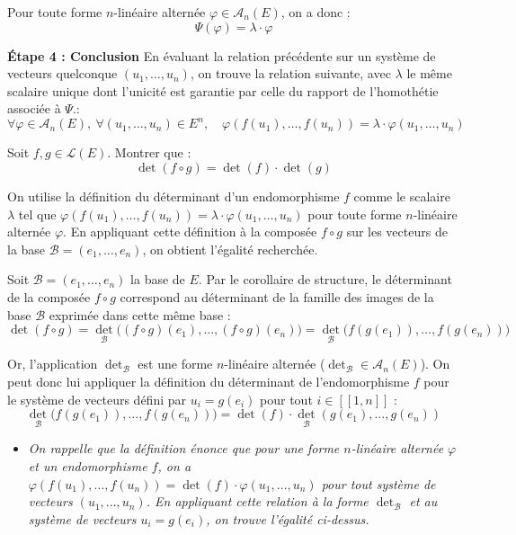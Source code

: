 \documentclass[11pt, a4paper]{article}
\theoremstyle{definition}
\begin{document}
\begin{outline}
	\2 Pour toute forme $n$-linéaire alternée $\varphi \in \mathscr{A}_n(E)$, on a donc :
	$$\Psi(\varphi) = \lambda \cdot \varphi$$

	\1 \textbf{Étape 4 : Conclusion}
	\2 En évaluant la relation précédente sur un système de vecteurs quelconque $(u_1, \dots, u_n)$, on trouve la relation suivante, avec $\lambda$ le même scalaire unique dont l'unicité est garantie par celle du rapport de l'homothétie associée à $\Psi$.:
	$$\forall \varphi \in \mathscr{A}_n(E), \ \forall (u_1, \dots, u_n) \in E^n, \quad \varphi(f(u_1), \dots, f(u_n)) = \lambda \cdot \varphi(u_1, \dots, u_n)$$
\end{outline}

\clearpage

\begin{tcolorbox}[instructionstyle]
	Soit $f, g \in \mathcal{L}(E)$. Montrer que :
	$$\det(f \circ g) = \det(f) \cdot \det(g)$$
\end{tcolorbox}

\begin{tcolorbox}[methodstyle]
	On utilise la définition du déterminant d'un endomorphisme $f$ comme le scalaire $\lambda$ tel que $\varphi(f(u_1), \dots, f(u_n)) = \lambda \cdot \varphi(u_1, \dots, u_n)$ pour toute forme $n$-linéaire alternée $\varphi$. En appliquant cette définition à la composée $f \circ g$ sur les vecteurs de la base $\mathcal{B} = (e_1, \dots, e_n)$, on obtient l'égalité recherchée.
\end{tcolorbox}

Soit $\mathcal{B} = (e_1, \dots, e_n)$ la base de $E$. Par le corollaire de structure, le déterminant de la composée $f \circ g$ correspond au déterminant de la famille des images de la base $\mathcal{B}$ exprimée dans cette même base :
$$\det(f \circ g) = \det_{\mathcal{B}}\bigl((f \circ g)(e_1), \dots, (f \circ g)(e_n)\bigr) = \det_{\mathcal{B}}\bigl(f(g(e_1)), \dots, f(g(e_n))\bigr)$$

Or, l'application $\det_{\mathcal{B}}$ est une forme $n$-linéaire alternée ($\det_{\mathcal{B}} \in \mathscr{A}_n(E)$). On peut donc lui appliquer la définition du déterminant de l'endomorphisme $f$ pour le système de vecteurs défini par $u_i = g(e_i)$ pour tout $i \in [\![1,n]\!]$ :
$$\det_{\mathcal{B}}\bigl(f(g(e_1)), \dots, f(g(e_n))\bigr) = \det(f) \cdot \det_{\mathcal{B}}(g(e_1), \dots, g(e_n))$$

\begin{itemize}
	\item \textit{On rappelle que la définition énonce que pour une forme $n$-linéaire alternée $\varphi$ et un endomorphisme $f$, on a $\varphi(f(u_1), \dots, f(u_n)) = \det(f) \cdot \varphi(u_1, \dots, u_n)$ pour tout système de vecteurs $(u_1, \dots, u_n)$. En appliquant cette relation à la forme $\det_{\mathcal{B}}$ et au système de vecteurs $u_i = g(e_i)$, on trouve l'égalité ci-dessus.}
\end{itemize}
\end{document}
